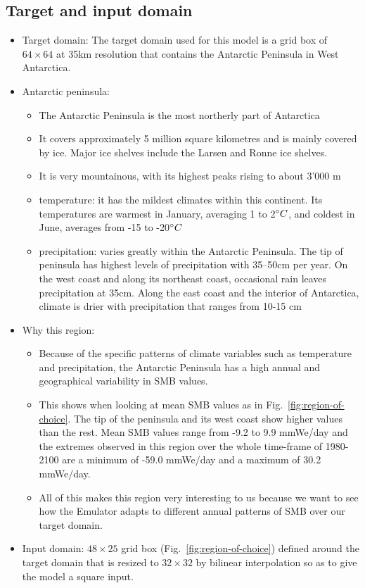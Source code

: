 \documentclass[a4paper,11pt,oneside]{report}
\begin{document}
\subsection{Target and input domain}
\begin{itemize}
    \item Target domain: The target domain used for this model is a grid box of $64 \times 64$ at 35km resolution that contains the Antarctic Peninsula in West Antarctica. 
    \item Antarctic peninsula: 
    \begin{itemize}
        \item The Antarctic Peninsula is the most northerly part of Antarctica
        \item It covers approximately 5 million square kilometres and is mainly covered by ice. Major ice shelves include the Larsen and Ronne ice shelves.
        \item It is very mountainous, with its highest peaks rising to about 3'000 m
        \item temperature: it has the mildest climates within this continent. Its temperatures are warmest in January, averaging 1 to 2$\degree C$, and coldest in June, averages from -15 to -20$\degree C$~\cite{AntarcticPeninsula}
        \item precipitation: varies greatly within the Antarctic Peninsula. The tip of peninsula has highest levels of precipitation with 35–50cm per year. On the west coast and along its northeast coast, occasional rain leaves precipitation at 35cm. Along the east coast and the interior of Antarctica, climate is drier with precipitation that ranges from 10-15 cm~\cite{antarctic-climate, antarctic-climate-2}
    \end{itemize} 
    \item Why this region: 
    \begin{itemize}
        \item Because of the specific patterns of climate variables such as temperature and precipitation, the Antarctic Peninsula has a high annual and geographical variability in SMB values. 
        \item This shows when looking at mean SMB values as in Fig.~\ref{fig:region-of-choice}. The tip of the peninsula and its west coast show higher values than the rest. Mean SMB values range from -9.2 to 9.9 mmWe/day and the extremes observed in this region over the whole time-frame of 1980-2100 are a minimum of -59.0 mmWe/day and a maximum of 30.2 mmWe/day. 
        \item All of this makes this region very interesting to us because we want to see how the Emulator adapts to different annual patterns of SMB over our target domain.  
    \end{itemize}
    \item Input domain: $48\times25$ grid box (Fig.~\ref{fig:region-of-choice}) defined around the target domain that is resized to $32\times 32$ by bilinear interpolation so as to give the model a square input.
\end{itemize}
\end{document}

